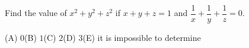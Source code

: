 Find the value of $x^2+y^2+z^2$ if $x+y+z=1$ and $\dfrac{1}{x}+\dfrac{1}{y}+\dfrac{1}{z}=0$.

(A) $0$\quad (B) $1$\quad (C) $2$\quad (D) $3$\quad (E) it is impossible to determine
